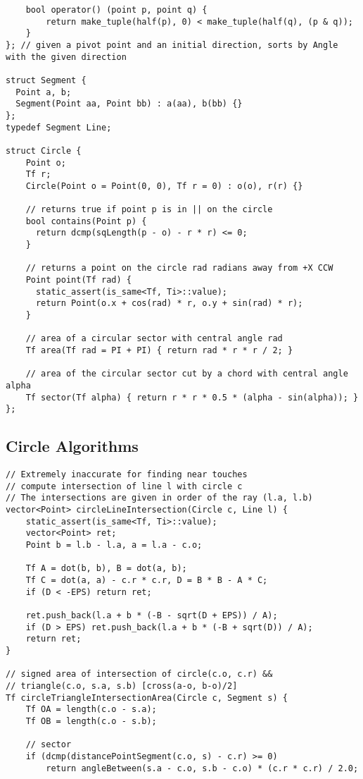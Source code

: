 \documentclass[10pt,a4paper,onesided]{article}
\begin{document}
\begin{multicols*}{3}
\begin{lstlisting}
    bool operator() (point p, point q) {
        return make_tuple(half(p), 0) < make_tuple(half(q), (p & q));
    }
}; // given a pivot point and an initial direction, sorts by Angle with the given direction

struct Segment {
  Point a, b;
  Segment(Point aa, Point bb) : a(aa), b(bb) {}
};
typedef Segment Line;

struct Circle {
    Point o;
    Tf r;
    Circle(Point o = Point(0, 0), Tf r = 0) : o(o), r(r) {}

    // returns true if point p is in || on the circle
    bool contains(Point p) {
      return dcmp(sqLength(p - o) - r * r) <= 0;
    }

    // returns a point on the circle rad radians away from +X CCW
    Point point(Tf rad) {
      static_assert(is_same<Tf, Ti>::value);
      return Point(o.x + cos(rad) * r, o.y + sin(rad) * r);
    }

    // area of a circular sector with central angle rad
    Tf area(Tf rad = PI + PI) { return rad * r * r / 2; }

    // area of the circular sector cut by a chord with central angle alpha
    Tf sector(Tf alpha) { return r * r * 0.5 * (alpha - sin(alpha)); }
};

\end{lstlisting}
\subsection{Circle Algorithms}
\begin{lstlisting}
// Extremely inaccurate for finding near touches
// compute intersection of line l with circle c
// The intersections are given in order of the ray (l.a, l.b)
vector<Point> circleLineIntersection(Circle c, Line l) {
    static_assert(is_same<Tf, Ti>::value);
    vector<Point> ret;
    Point b = l.b - l.a, a = l.a - c.o;

    Tf A = dot(b, b), B = dot(a, b);
    Tf C = dot(a, a) - c.r * c.r, D = B * B - A * C;
    if (D < -EPS) return ret;

    ret.push_back(l.a + b * (-B - sqrt(D + EPS)) / A);
    if (D > EPS) ret.push_back(l.a + b * (-B + sqrt(D)) / A);
    return ret;
}

// signed area of intersection of circle(c.o, c.r) &&
// triangle(c.o, s.a, s.b) [cross(a-o, b-o)/2]
Tf circleTriangleIntersectionArea(Circle c, Segment s) {
    Tf OA = length(c.o - s.a);
    Tf OB = length(c.o - s.b);

    // sector
    if (dcmp(distancePointSegment(c.o, s) - c.r) >= 0)
        return angleBetween(s.a - c.o, s.b - c.o) * (c.r * c.r) / 2.0;


\end{lstlisting}
\end{multicols*}
\end{document}
